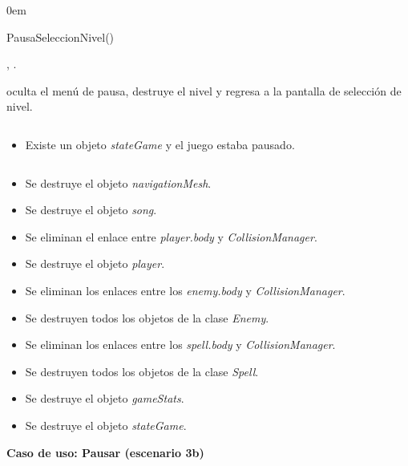\begin{description}
    \itemsep0em
    \item [Operación] PausaSeleccionNivel()
    \item [Actores] \jugador, \sistema.
    \item [Responsabilidades] oculta el menú de pausa, destruye el nivel y
    regresa a la pantalla de selección de nivel.
    \item [Precondiciones]$\quad$
        \begin{itemize}
            \itemsep0em
            \item Existe un objeto \textit{stateGame} y el juego estaba pausado.
        \end{itemize}
    \item [Postcondiciones]$\quad$
        \begin{itemize}
            \itemsep0em
            \item Se destruye el objeto \textit{navigationMesh}.
            \item Se destruye el objeto \textit{song}.
            \item Se eliminan el enlace entre \textit{player.body} y \textit{CollisionManager}.
            \item Se destruye el objeto \textit{player}.
            \item Se eliminan los enlaces entre los \textit{enemy.body}
            y \textit{CollisionManager}.
            \item Se destruyen todos los objetos de la clase \textit{Enemy}.
            \item Se eliminan los enlaces entre los \textit{spell.body} y
            \textit{CollisionManager}.
            \item Se destruyen todos los objetos de la clase \textit{Spell}.
            \item Se destruye el objeto \textit{gameStats}.
            \item Se destruye el objeto \textit{stateGame}.\\
        \end{itemize}
\end{description}

\textbf{Caso de uso: Pausar (escenario 3b)}


